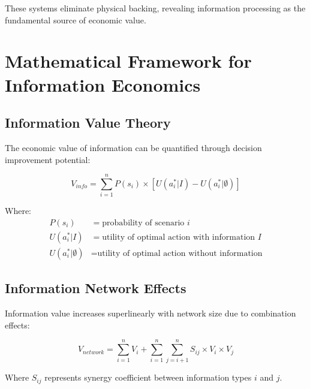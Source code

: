 \documentclass[12pt,a4paper]{article}
\begin{document}
These systems eliminate physical backing, revealing information processing as the fundamental source of economic value.

\section{Mathematical Framework for Information Economics}

\subsection{Information Value Theory}

The economic value of information can be quantified through decision improvement potential:

\begin{equation}
V_{info} = \sum_{i=1}^{n} P(s_i) \times [U(a^*_i | I) - U(a^*_i | \emptyset)]
\end{equation}

Where:
\begin{align}
P(s_i) &= \text{probability of scenario } i \\
U(a^*_i | I) &= \text{utility of optimal action with information } I \\
U(a^*_i | \emptyset) &= \text{utility of optimal action without information}
\end{align}

\subsection{Information Network Effects}

Information value increases superlinearly with network size due to combination effects:

\begin{equation}
V_{network} = \sum_{i=1}^{n} V_i + \sum_{i=1}^{n} \sum_{j=i+1}^{n} S_{ij} \times V_i \times V_j
\end{equation}

Where $S_{ij}$ represents synergy coefficient between information types $i$ and $j$.
\end{document}
